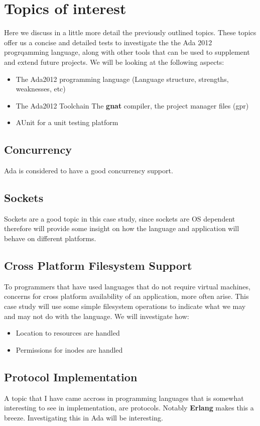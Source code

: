 \section{Topics of interest}
Here we discuss in a little more detail the previously outlined topics. These
topics offer us a concise and detailed tests to investigate the the Ada 2012
progrqamming language, along with other tools that can be used to supplement
and extend future projects. We will be looking at the following aspects:
\begin{itemize}
\item{The Ada2012} programming language (Language structure, strengths,
weaknesses, etc)
\item{The Ada2012 Toolchain} The \textbf{gnat} compiler, the project manager
files (gpr)
\item{AUnit} for a unit testing platform
\end{itemize}

\subsection{Concurrency}
Ada is considered to have a good concurrency support. 

\subsection{Sockets}
Sockets are a good topic in this case study, since sockets are OS dependent
therefore will provide some insight on how the language and application will
behave on different platforms. 

\subsection{Cross Platform Filesystem Support}
To programmers that have used languages that do not require virtual machines,
concerns for cross platform availability of an application, more often arise.
This case study will use some simple filesystem operations to indicate what we
may and may not do with the language. We will investigate how:
\begin{itemize}
  \item Location to resources are handled
  \item Permissions for inodes are handled
\end{itemize}

\subsection{Protocol Implementation}
A topic that I have came accross in programming languages that is somewhat
interesting to see in implementation, are protocols. Notably \textbf{Erlang} 
makes this a breeze. Investigating this in Ada will be interesting. 

